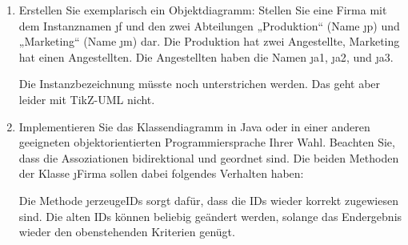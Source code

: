 \documentclass{bschlangaul-aufgabe}
\begin{document}
\begin{enumerate}


\item Erstellen Sie exemplarisch ein Objektdiagramm: Stellen Sie eine
Firma mit dem Instanznamen \j{f} und den zwei Abteilungen
„Produktion“ (Name \j{p}) und „Marketing“ (Name \j{m})
dar. Die Produktion hat zwei Angestellte, Marketing hat einen
Angestellten. Die Angestellten haben die Namen \j{a1},
\j{a2}, und \j{a3}.

\begin{bAntwort}
Die Instanzbezeichnung müsste noch unterstrichen werden. Das geht aber
leider mit TikZ-UML nicht.
\begin{center}
\end{center}
\end{bAntwort}


\item Implementieren Sie das Klassendiagramm in Java oder in einer
anderen geeigneten objektorientierten Programmiersprache Ihrer Wahl.
Beachten Sie, dass die Assoziationen bidirektional und geordnet sind.
Die beiden Methoden der Klasse \j{Firma} sollen dabei folgendes
Verhalten haben:

Die Methode \j{erzeugeIDs} sorgt dafür, dass die IDs wieder
korrekt zugewiesen sind. Die alten IDs können beliebig geändert werden,
solange das Endergebnis wieder den obenstehenden Kriterien genügt.

\begin{bAntwort}
\end{bAntwort}


\end{enumerate}
\end{document}
